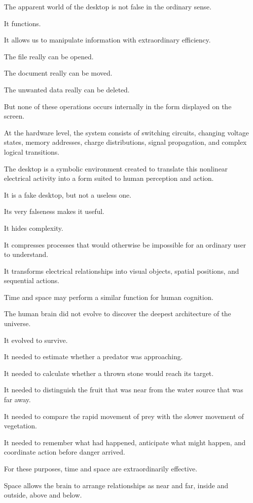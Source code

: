 The apparent world of the desktop is not false in the ordinary sense.

It functions.

It allows us to manipulate information with extraordinary efficiency.

The file really can be opened.

The document really can be moved.

The unwanted data really can be deleted.

But none of these operations occurs internally in the form displayed on the screen.

At the hardware level, the system consists of switching circuits, changing voltage states, memory addresses, charge distributions, signal propagation, and complex logical transitions.

The desktop is a symbolic environment created to translate this nonlinear electrical activity into a form suited to human perception and action.

It is a fake desktop, but not a useless one.

Its very falseness makes it useful.

It hides complexity.

It compresses processes that would otherwise be impossible for an ordinary user to understand.

It transforms electrical relationships into visual objects, spatial positions, and sequential actions.

Time and space may perform a similar function for human cognition.

The human brain did not evolve to discover the deepest architecture of the universe.

It evolved to survive.

It needed to estimate whether a predator was approaching.

It needed to calculate whether a thrown stone would reach its target.

It needed to distinguish the fruit that was near from the water source that was far away.

It needed to compare the rapid movement of prey with the slower movement of vegetation.

It needed to remember what had happened, anticipate what might happen, and coordinate action before danger arrived.

For these purposes, time and space are extraordinarily effective.

Space allows the brain to arrange relationships as near and far, inside and outside, above and below.

